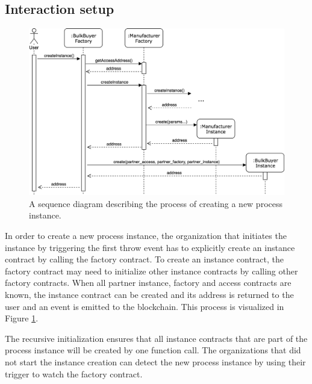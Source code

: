 \documentclass[runningheads]{llncs}
\begin{document}
\subsection{Interaction setup}
\begin{figure}
	\centering
	\includegraphics[width=\textwidth]{fig/instance_creation.eps}
	\caption{A sequence diagram describing the process of creating a new process instance.}
	\label{fig:instance_creation}
\end{figure}

In order to create a new process instance, the organization that initiates the instance by triggering the first throw event has to explicitly create an instance contract by calling the factory contract.
To create an instance contract, the factory contract may need to initialize other instance contracts by calling other factory contracts.
When all partner instance, factory and access contracts are known, the instance contract can be created and its address is returned to the user and an event is emitted to the blockchain.
This process is visualized in Figure \ref{fig:instance_creation}.

The recursive initialization ensures that all instance contracts that are part of the process instance will be created by one function call.
The organizations that did not start the instance creation can detect the new process instance by using their trigger to watch the factory contract.
\end{document}

